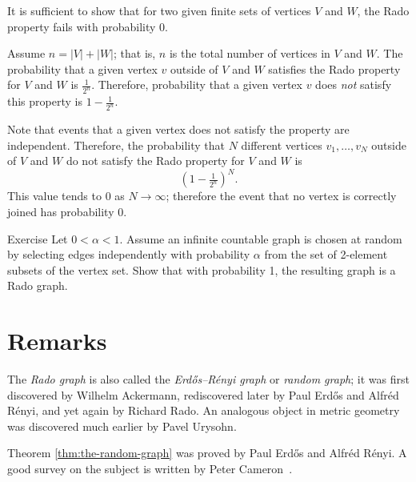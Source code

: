 It is sufficient to show that for two given finite sets of vertices $V$ and $W$, the Rado property fails with probability 0.

Assume $n=|V|+|W|$; that is, $n$ is the total number of vertices in $V$ and $W$.
The probability that a given vertex $v$ outside of $V$ and $W$ satisfies the Rado property for $V$ and $W$
is $\tfrac1{2^n}$.
Therefore, probability that a given vertex $v$ does \textit{not} satisfy this property
is $1-\tfrac1{2^n}$.

Note that events that a given vertex does not satisfy the property are independent.
Therefore, the probability that $N$ different vertices $v_1,\dots,v_N$ outside of $V$ and $W$ do not satisfy the Rado property for $V$ and $W$ is 
\[(1-\tfrac1{2^n})^N.\]
This value tends to 0 as $N \to \infty$; 
therefore the event that no vertex is correctly joined has probability 0.
\qeds

\begin{thm}{Exercise}\label{ex:rado-radnom}
Let $0<\alpha<1$.
Assume an infinite countable graph is chosen at random by selecting edges independently with probability $\alpha$ from the set of 2-element subsets of the vertex set.
Show that with probability 1, the resulting graph is a Rado graph.
\end{thm}

\section{Remarks}

The {}\emph{Rado graph} is also called the \emph{Erd\H{o}s–R\'enyi graph} or \emph{random graph};
it was first discovered by Wilhelm Ackermann, rediscovered later by
Paul Erd\H{o}s and Alfr\'ed R\'enyi, and yet again by Richard Rado. 
An analogous object in metric geometry was discovered much earlier by Pavel Urysohn. 

Theorem \ref{thm:the-random-graph} was proved by Paul Erd\H{o}s and Alfr\'ed R\'enyi.
A good survey on the subject is written by Peter Cameron~\cite{cameron}.


